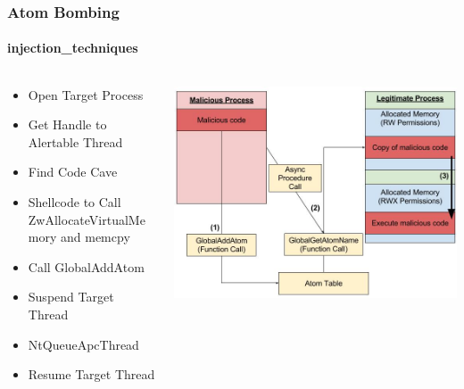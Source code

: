 \documentclass[aspectratio=169]{beamer}
\begin{document}
\begin{frame}
  \frametitle{Atom Bombing}
  \framesubtitle{injection\_techniques}
  \begin{columns}
    \begin{column}{.4\textwidth}
      \begin{itemize}
        \item{Open Target Process}
        \item{Get Handle to Alertable Thread}
        \item{Find Code Cave}
        \item{Shellcode to Call ZwAllocateVirtualMemory and memcpy}
        \item{Call GlobalAddAtom}
        \item {Suspend Target Thread}
        \item{NtQueueApcThread}
        \item{Resume Target Thread}
      \end{itemize}
    \end{column}
    \hfill
    \begin{column}{.6\textwidth}
      \begin{center}
        \includegraphics[scale=0.30]{atom-bombing}
      \end{center}
    \end{column}
  \end{columns}
\end{frame}
\end{document}
